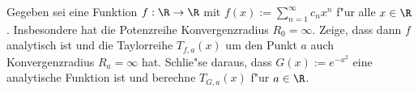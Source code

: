 \begin{prob}
Gegeben sei eine Funktion $f:\R\to\R$ mit $f(x):=\sum_{n=1}^\infty c_nx^n$ f"ur alle $x\in\R$. Insbesondere hat die Potenzreihe Konvergenzradius $R_0=\infty$. Zeige, dass dann $f$ analytisch ist und die Taylorreihe $T_{f,a}(x)$ um den Punkt $a$ auch Konvergenzradius $R_a=\infty$ hat. Schlie"se daraus, dass $G(x):=e^{-x^2}$ eine analytische Funktion ist und berechne $T_{G,a}(x)$ f"ur $a\in\R$.
\end{prob}

